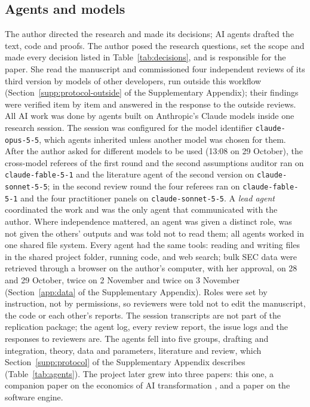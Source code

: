 \subsection{Agents and models}\label{app:protocol-agents}
The author directed the research and made its decisions; AI agents drafted the text, code and proofs. The author posed the research questions, set the scope and made every decision listed in Table~\ref{tab:decisions}, and is responsible for the paper. She read the manuscript and commissioned four independent reviews of its third version by models of other developers, run outside this workflow (Section~\ref{supp:protocol-outside} of the Supplementary Appendix); their findings were verified item by item and answered in the response to the outside reviews. All AI work was done by agents built on Anthropic's Claude models inside one research session. The session was configured for the model identifier \texttt{claude-opus-5-5}, which agents inherited unless another model was chosen for them. After the author asked for different models to be used (13:08 on 29 October), the cross-model referees of the first round and the second assumptions auditor ran on \texttt{claude-fable-5-1} and the literature agent of the second version on \texttt{claude-sonnet-5-5}; in the second review round the four referees ran on \texttt{claude-fable-5-1} and the four practitioner panels on \texttt{claude-sonnet-5-5}. A \emph{lead agent} coordinated the work and was the only agent that communicated with the author. Where independence mattered, an agent was given a distinct role, was not given the others' outputs and was told not to read them; all agents worked in one shared file system. Every agent had the same tools: reading and writing files in the shared project folder, running code, and web search; bulk SEC data were retrieved through a browser on the author's computer, with her approval, on 28 and 29 October, twice on 2 November and twice on 3 November (Section~\ref{app:data} of the Supplementary Appendix). Roles were set by instruction, not by permissions, so reviewers were told not to edit the manuscript, the code or each other's reports. The session transcripts are not part of the replication package; the agent log, every review report, the issue logs and the responses to reviewers are. The agents fell into five groups, drafting and integration, theory, data and parameters, literature and review, which Section~\ref{supp:protocol} of the Supplementary Appendix describes (Table~\ref{tab:agents}). The project later grew into three papers: this one, a companion paper on the economics of AI transformation \citep{murthy2026transformation}, and a paper on the software engine.

